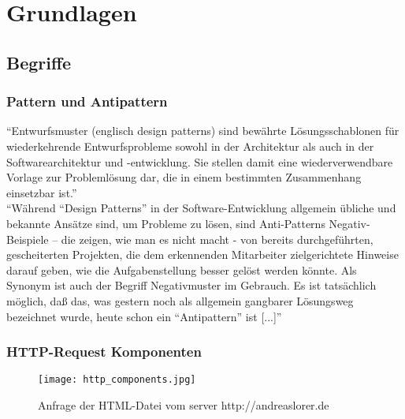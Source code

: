 

\section{Grundlagen} %
\label{sec:grundlagen}

	\subsection{Begriffe}
	\label{sub:begriffe}
		\subsubsection{Pattern und Antipattern} %
		\label{ssub:pattern_und_anti_pattern}
			"`Entwurfsmuster (englisch design patterns) sind bewährte Lösungsschablonen für wiederkehrende Entwurfsprobleme sowohl in der Architektur als auch in der Softwarearchitektur und -entwicklung. Sie stellen damit eine wiederverwendbare Vorlage zur Problemlösung dar, die in einem bestimmten Zusammenhang einsetzbar ist."'\autocite{pattern15}
			\\

			"`Während "`Design Patterns"' in der Software-Entwicklung allgemein übliche und bekannte Ansätze sind, um Probleme zu lösen, sind Anti-Patterns Negativ-Beispiele – die zeigen, wie man es nicht macht - von bereits durchgeführten, gescheiterten Projekten, die dem erkennenden Mitarbeiter zielgerichtete Hinweise darauf geben, wie die Aufgabenstellung besser gelöst werden könnte. Als Synonym ist auch der Begriff Negativmuster im Gebrauch. Es ist tatsächlich möglich, daß das, was gestern noch als allgemein gangbarer Lösungsweg bezeichnet wurde, heute schon ein "`Antipattern"' ist [...]"' \autocite{Stepken06}


		\subsubsection{HTTP-Request Komponenten} %
		\label{ssub:http_request_komponente}
			\begin{figure}[htbp]
				\begin{center}
					\texttt{[image: http\_components.jpg]}
					\caption{Anfrage der HTML-Datei vom server http://andreaslorer.de}
					\label{fig:http_components}
				\end{center}
			\end{figure}

